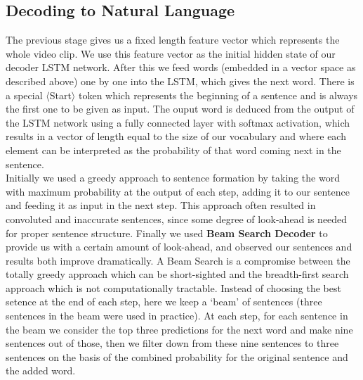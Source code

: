 \documentclass[12pt]{article}
\begin{document}
\subsection{Decoding to Natural Language}
The previous stage gives us a fixed length feature vector which represents the whole video clip. We use this feature vector as the initial hidden state of our decoder LSTM network. After this we feed words (embedded in a vector space as described above) one by one into the LSTM, which gives the next word. There is a special $\langle$Start$\rangle$ token which represents the beginning of a sentence and is always the first one to be given as input. The ouput word is deduced from the output of the LSTM network using a fully connected layer with softmax activation, which results in a vector of length equal to the size of our vocabulary and where each element can be interpreted as the probability of that word coming next in the sentence.\\
Initially we used a greedy approach to sentence formation by taking the word with maximum probability at the output of  each step, adding it to our sentence and feeding it as input in the next step. This approach often resulted in convoluted and inaccurate sentences, since some degree of look-ahead is needed for proper sentence structure. Finally we used \textbf{Beam Search Decoder} to provide us with a  certain amount of look-ahead, and observed our sentences and results both improve dramatically. A Beam Search is a compromise between the totally greedy approach which can be short-sighted and the breadth-first search approach which is not computationally tractable. Instead of choosing the best setence at the end of each step, here we keep a  `beam' of sentences (three sentences in the beam were used in practice). At each step, for each sentence in the beam we consider the top three predictions for the next word and make nine sentences out of those, then we filter down from these nine sentences to three sentences on the basis of the combined probability for the original sentence and the added word.
\end{document}
